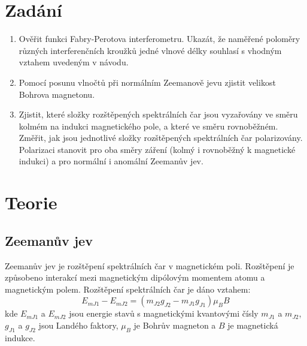 \documentclass[a4paper,11pt]{article}
\begin{document}
\vskip0pt
    \begin{minipage}[t]{0.5\textwidth} 
        \section{Zadání}    
            \begin{enumerate}
                \item Ověřit funkci Fabry-Perotova interferometru. Ukazát, že naměřené poloměry různých interferenčních kroužků jedné vlnové délky souhlasí s vhodným vztahem uvedeným v návodu.
                \item Pomocí posunu vlnočtů při normálním Zeemanově jevu zjistit velikost Bohrova magnetonu.
                \item Zjistit, které složky rozštěpených spektrálních čar jsou vyzařovány ve směru kolmém na indukci magnetického pole, a které ve směru rovnoběžném. Změřit, jak jsou jednotlivé složky rozštěpených spektrálních čar polarizovány. Polarizaci stanovit pro oba směry záření (kolmý i rovnoběžný k magnetické indukci) a pro normální i anomální Zeemanův jev.
            \end{enumerate}
        \section{Teorie}
            \subsection{Zeemanův jev}
                Zeemanův jev je rozštěpení spektrálních čar v magnetickém poli. Rozštěpení je způsobeno interakcí mezi magnetickým dipólovým momentem atomu a magnetickým polem. Rozštěpení spektrálních čar je dáno vztahem:
                \begin{equation}
                    E_{mJ1} - E_{mJ2} = (m_{J2} g_{J2} - m_{J1} g_{J1}) \mu_B B
                \end{equation}
                kde $E_{mJ1}$ a $E_{mJ2}$ jsou energie stavů s magnetickými kvantovými čísly $m_{J1}$ a $m_{J2}$, $g_{J1}$ a $g_{J2}$ jsou Landého faktory, $\mu_B$ je Bohrův magneton a $B$ je magnetická indukce.
    \end{minipage}
    \hspace{10pt}
\end{document}

